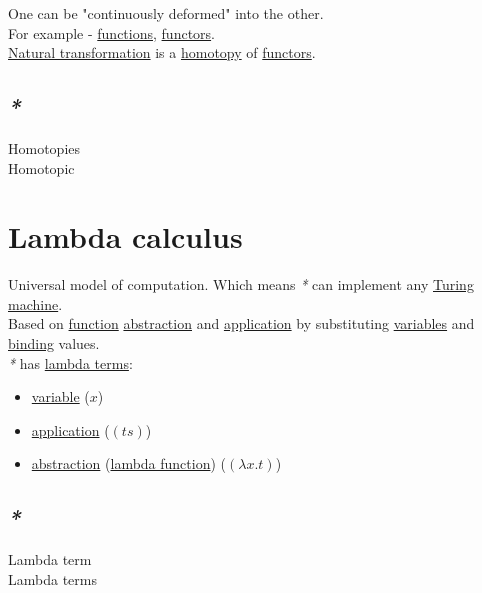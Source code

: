 \documentclass[a4paper,14pt,oneside]{book}
\begin{document}
One can be "continuously deformed" into the other.\\

For example - \hyperref[org69a4fa1]{functions}, \hyperref[org9276317]{functors}.\\
\hyperref[orgf792940]{Natural transformation} is a \hyperref[org5eebdec]{homotopy} of \hyperref[org9276317]{functors}.\\

\section{\emph{*}}
\label{sec:orgd755afe}

\label{orgd6fdc46}Homotopies\\
\label{org796ff19}Homotopic\\

\chapter{\label{org8e6f535}Lambda calculus}
\label{sec:org28287cd}
Universal model of computation. Which means \emph{*} can implement any \hyperref[org7792735]{Turing machine}.\\
Based on \hyperref[org062ed2a]{function} \hyperref[org864aee0]{abstraction} and \hyperref[org82f57c3]{application} by substituting \hyperref[org7d16fd7]{variables} and \hyperref[org3ae9e7c]{binding} values.\\

\emph{*} has \hyperref[org6d05e30]{lambda terms}:\\
\begin{itemize}
\item \hyperref[org3bf8dd2]{variable} (\(x\))\\
\item \hyperref[org82f57c3]{application} (\((ts)\))\\
\item \hyperref[org864aee0]{abstraction} (\hyperref[orgf055088]{lambda function}) (\((\lambda x . t)\))\\
\end{itemize}

\section{\emph{*}}
\label{sec:orgbed8166}

\label{org68677c8}Lambda term\\
\label{org6d05e30}Lambda terms\\
\end{document}
